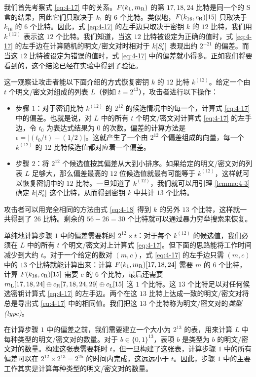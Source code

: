 \begin{snote}
我们首先考察式 \ref{eq:4-17} 中的关系。$F(k_1,m_{\rm R})$ 的第 $17,18,24$ 比特是同一个的 S 盒的结果，因此它们只取决于 $k_1$ 的 $6$ 个比特。类似地，$F(k_{16},c_{\rm R})[15]$ 只取决于 $k_{16}$ 的 $6$ 个比特。因此，式 \ref{eq:4-17} 的左手边只取决于密钥 $k$ 的 $12$ 比特，我们用 $k^{(12)}$ 表示这 $12$ 个比特。我们知道，当这 $12$ 比特被设定为正确的值时，式 \ref{eq:4-17} 的左手边在计算随机的明文/密文对时相对于 $k[S_{\rm e}']$ 表现出约 $2^{-21}$ 的偏差。而当这 $12$ 比特被设定为错误的值时，式 \ref{eq:4-17} 中的偏差就小得多。正如我们将要看到的，这个结论已经在实验中得到了验证。

这一观察让攻击者能以下面介绍的方式恢复密钥 $k$ 的 $12$ 比特 $k^{(12)}$。给定一个由 $t$ 个明文/密文对组成的列表 $L$（例如 $t=2^{43}$），攻击者进行以下操作：
\begin{itemize}
    \item 步骤 $1$：对于密钥比特 $k^{(12)}$ 的 $2^{12}$ 的候选情况中的每一个，计算式 \ref{eq:4-17} 中的偏差。也就是说，对 $L$ 中的所有 $t$ 个明文/密文对计算式 \ref{eq:4-17} 的左手边，令 $t_0$ 为表达式结果为 $0$ 的次数。偏差的计算方法是$\epsilon=|(t_0/t)-(1/2)|$。这就产生了一个由 $2^{12}$ 个偏差组成的向量，每一个 $k^{(12)}$ 的 $12$ 比特候选值都对应着一个偏差。
	\item 步骤 $2$：将 $2^{12}$ 个候选值按其偏差从大到小排序。如果给定的明文/密文对的列表 $L$ 足够大，那么偏差最高的 $12$ 位候选值就最有可能等于 $k^{(12)}$，这样就可以恢复密钥中的 $12$ 比特。一旦知道了 $k^{(12)}$，我们就可以用引理 \ref{lemma:4-3} 确定 $k[S_{\rm e}']$ 这个比特，从而得到密钥 $k$ 中共计 $13$ 个比特。
\end{itemize}
攻击者可以用完全相同的方法由式 \ref{eq:4-18} 得到 $k$ 的另外 $13$ 个比特，这样就一共得到了 $26$ 比特。剩余的 $56-26=30$ 个比特就可以通过暴力穷举搜索来恢复。

单纯地计算步骤 $1$ 中的偏差需要耗时 $2^{12}\times t$：对于每个 $k^{(12)}$ 的候选值，我们必须在 $L$ 中的所有 $t$ 个明文/密文对上计算式 \ref{eq:4-17}。但下面的思路能将工作时间减少到大约 $t$。对于一个给定的数对 $(m,c)$，式 \ref{eq:4-17} 的左手边只需 $(m,c)$ 中的 $13$ 个比特就能计算出来：计算 $F(k_1,m_{\rm R})[17,18,24]$ 需要 $m$ 的 $6$ 个比特，计算 $F(k_{16},c_{\rm R})[15]$ 需要 $c$ 的 $6$ 个比特，最后还需要 $m_{\rm L}[17,18,24]\oplus c_{\rm R}[7,18,24,29]\oplus c_{\rm L}[15]$ 这 $1$ 个比特。这 $13$ 个比特足以对任何候选密钥计算式 \ref{eq:4-17} 的左手边。两个在这 $13$ 比特上达成一致的明文/密文对将总是导出式 \ref{eq:4-17} 中的相同值。我们把这 $13$ 个比特称为明文/密文对的\emph{类型(type)}。

在计算步骤 $1$ 中的偏差之前，我们需要建立一个大小为 $2^{13}$ 的表，用来计算 $L$ 中每种类型的明文/密文对的数量。对于 $b\in\{0,1\}^{13}$，表项 $b$ 是类型为 $b$ 的明文/密文对的数量。构建这张表需要耗时 $t$，但一旦构建了这张表，计算步骤 $1$ 中的所有偏差可以在 $2^{12}\times 2^{13}=2^{25}$ 的时间内完成，这远远小于 $t$。因此，步骤 $1$ 中的主要工作其实是计算每种类型的明文/密文对的数量。


\end{snote}
